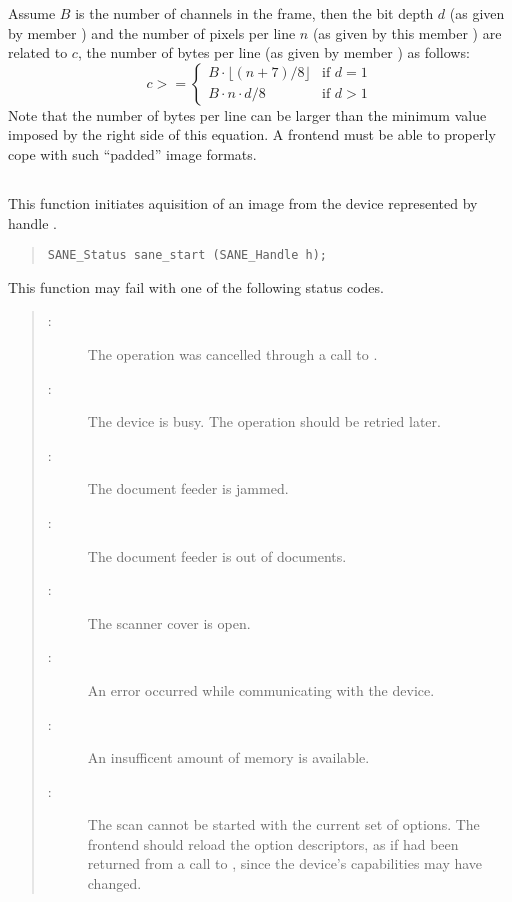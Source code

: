 \documentclass[11pt,DVIps]{report}
\begin{document}
Assume $B$ is the number of channels in the frame, then the bit depth
$d$ (as given by member ) and the number of pixels per
line $n$ (as given by this member ) are
related to $c$, the number of bytes per line (as given by member
) as follows:
\[
  c >= \left\{
  \begin{array}{ll}
    B\cdot \lfloor (n + 7) / 8\rfloor & \mbox{if $d=1$}\\
    B\cdot n \cdot d / 8 & \mbox{if $d>1$}
  \end{array}
  \right.
\]
Note that the number of bytes per line can be larger than the minimum
value imposed by the right side of this equation.  A frontend must be
able to properly cope with such ``padded'' image formats.


\subsection{}

This function initiates aquisition of an image from the device
represented by handle .
\begin{quote}
\begin{verbatim}
SANE_Status sane_start (SANE_Handle h);
\end{verbatim}
\end{quote}
This function may fail with one of the following status codes.
\begin{quote}
\begin{description}
\item[:] The operation was cancelled through
  a call to .
\item[:] The device is busy. The
  operation should be retried later.
\item[:] The document feeder is jammed.
\item[:] The document feeder is out of
  documents.
\item[:] The scanner cover is open.
\item[:] An error occurred while communicating
  with the device.
\item[:] An insufficent amount of memory
  is available.
\item[:] The scan cannot be started with the current
  set of options. The frontend should reload the option descriptors, as if
   had been returned from a call to
  , since the device's capabilities may have
  changed.
\end{description}
\end{quote}
\end{document}
